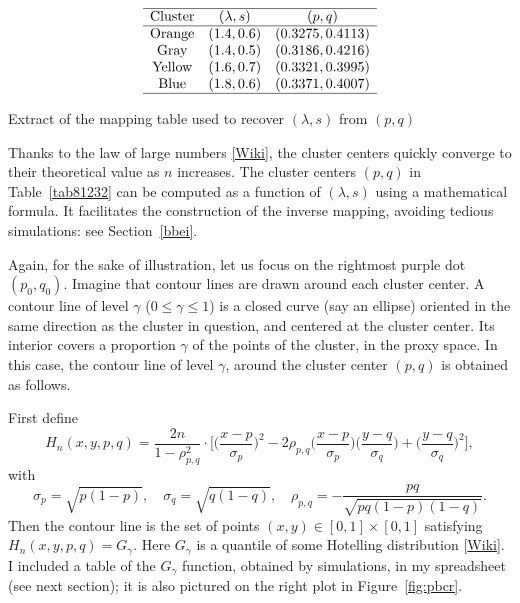 \documentclass[10pt]{article}
\begin{document}
\begin{table}[H]
\[
\begin{array}{ccc}
\hline
 \mbox{Cluster} &  (\lambda,  s) & (p, q) \\
\hline
 \mbox{Orange} & (1.4, 0.6) & (0.3275,  0.4113)\\
\mbox{Gray} & (1.4, 0.5) & (0.3186, 0.4216) \\
\mbox{Yellow} & (1.6,  0.7) & (0.3321, 0.3995)\\
\mbox{Blue} & (1.8, 0.6)&  (0.3371,  0.4007)\\
\hline
\end{array}
\]
\caption{\label{tab81232}Extract of the mapping table used to recover $(\lambda,s)$ from $(p,q)$}
\end{table}


\noindent Thanks to the
\textcolor{index}{law of large numbers} 
\href{https://en.wikipedia.org/wiki/Law_of_large_numbers}{[Wiki]}, the cluster centers quickly converge to their theoretical value as $n$ increases. The cluster
 centers $(p, q)$ in Table~\ref{tab81232} can be computed as a function
of $(\lambda, s)$ using a mathematical formula. It facilitates the construction of the inverse
mapping, avoiding tedious simulations: see Section~\ref{bbei}. 
\quad \\

\nopagebreak

\noindent Again, for the sake of illustration, let us focus on the rightmost purple dot $(p_0,q_0)$. Imagine that contour lines are drawn around each cluster center. A \textcolor{index}{contour line} of level
$\gamma$ ($0\leq\gamma\leq 1$) is a closed curve (say an ellipse) oriented in the same direction as the cluster in question, and centered at the cluster center. Its interior covers a proportion $\gamma$ of the points of the cluster, in the proxy space. In this case, the contour line of level $\gamma$, around the 
cluster center $(p,q)$ is obtained as follows. 

\noindent First define
\begin{equation}
H_n(x,y,p,q)=\frac{2n}{1-\rho_{p,q}^2}\cdot 
\Big[\Big( \frac{x-p}{\sigma_p}\Big)^2 
-2\rho_{p,q}\Big(\frac{x-p}{\sigma_p}\Big)\Big(\frac{y-q}{\sigma_q}\Big) 
+ \Big(\frac{y-q}{\sigma_q}\Big)^2\Big],\label{gauss2d}
\end{equation}
with
\begin{equation}
\sigma_p
=\sqrt{p(1-p)},
\quad \sigma_q=\sqrt{q(1-q)},
\quad \rho_{p,q}=-\frac{pq}{\sqrt{pq(1-p)(1-q)}}.
\end{equation}
Then the contour line is the set of points $(x,y)\in[0,1]\times[0,1]$ satisfying $H_n(x,y,p,q)=G_\gamma$. Here 
$G_\gamma$ is a quantile of some \textcolor{index}{Hotelling distribution}
 [\href{https://bit.ly/3uQ4a3t}{Wiki}]. I included a table of the $G_\gamma$ function, obtained by simulations, in my spreadsheet (see next section); it is also 
pictured on the right plot in Figure~\ref{fig:pbcr}.
\end{document}
